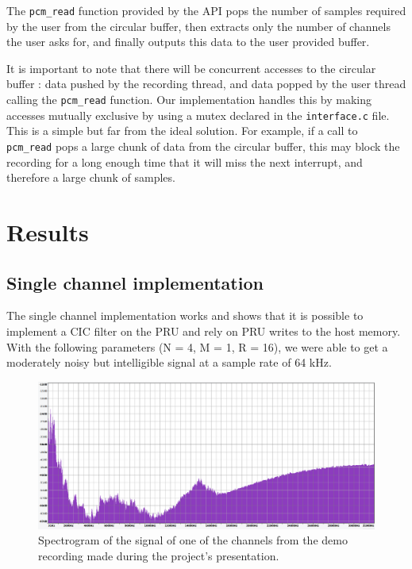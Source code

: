 \documentclass[]{report}
\begin{document}
The \texttt{pcm\_read} function provided by the API pops the number of samples required by the user from the circular buffer, then extracts only the number of channels the user asks for, and finally outputs this data to the user provided buffer.

It is important to note that there will be concurrent accesses to the circular buffer : data pushed by the recording thread, and data popped by the user thread calling the \texttt{pcm\_read} function. Our implementation handles this by making accesses mutually exclusive by using a mutex declared in the \texttt{interface.c} file. This is a simple but far from the ideal solution. For example, if a call to \texttt{pcm\_read} pops a large chunk of data from the circular buffer, this may block the recording for a long enough time that it will miss the next interrupt, and therefore a large chunk of samples.

\hypertarget{results}{%
\chapter{Results}\label{results}}

\hypertarget{single-channel-implementation}{%
\section{Single channel
implementation}\label{single-channel-implementation}}

The single channel implementation works and shows that it is possible to implement a CIC filter on the PRU and rely on PRU writes to the host memory. With the following parameters (N = 4, M = 1, R = 16), we were able to get a moderately noisy but intelligible signal at a sample rate of 64 kHz.

\begin{figure}[H]
\centering
\includegraphics[width=0.8\linewidth]{Pictures/spectrogram.png}
\caption{Spectrogram of the signal of one of the channels from the demo recording made during the project's presentation.}
\end{figure}
\end{document}

